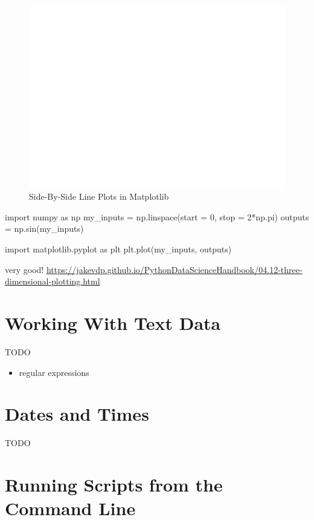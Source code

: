 \documentclass[
  12pt,
]{krantz}
\providecommand{\tightlist}{%
  \setlength{\itemsep}{0pt}\setlength{\parskip}{0pt}}
\begin{document}
\begin{figure}
\includegraphics[width=0.8\linewidth]{r_and_python_book_files/figure-latex/unnamed-chunk-179-5} \caption{Side-By-Side Line Plots in Matplotlib}\label{fig:unnamed-chunk-179}
\end{figure}

import numpy as np
my\_inputs = np.linspace(start = 0, stop = 2*np.pi)
outputs = np.sin(my\_inputs)

import matplotlib.pyplot as plt
plt.plot(my\_inputs, outputs)

very good! \url{https://jakevdp.github.io/PythonDataScienceHandbook/04.12-three-dimensional-plotting.html}

\hypertarget{working-with-text-data}{%
\chapter{Working With Text Data}\label{working-with-text-data}}

TODO

\begin{itemize}
\tightlist
\item
  regular expressions
\end{itemize}

\hypertarget{dates-and-times}{%
\chapter{Dates and Times}\label{dates-and-times}}

TODO

\hypertarget{running-scripts-from-the-command-line}{%
\chapter{Running Scripts from the Command Line}\label{running-scripts-from-the-command-line}}
\end{document}
